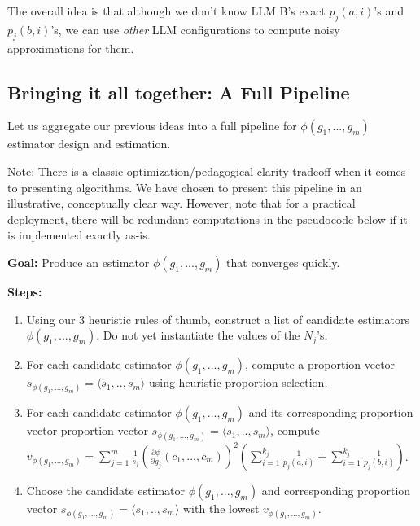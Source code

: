 \documentclass{article}
\begin{document}
The overall idea is that although we don't know LLM B's exact $\displaystyle p_{j}\left( a,i\right)$'s and $\displaystyle p_{j}\left( b,i\right)$'s, we can use \textit{other} LLM configurations to compute noisy approximations for them.



\subsection{Bringing it all together: A Full Pipeline}

Let us aggregate our previous ideas into a full pipeline for $\displaystyle \phi \left( g_{1} ,...,g_{m}\right)$ estimator design and estimation.



Note: There is a classic optimization/pedagogical clarity tradeoff when it comes to presenting algorithms. We have chosen to present this pipeline in an illustrative, conceptually clear way. However, note that for a practical deployment, there will be redundant computations in the pseudocode below if it is implemented exactly as-is.



\textbf{Goal:} Produce an estimator $\displaystyle \phi \left( g_{1} ,...,g_{m}\right)$ that converges quickly.



\textbf{Steps:}
\begin{enumerate}
\item Using our 3 heuristic rules of thumb, construct a list of candidate estimators $\displaystyle \phi \left( g_{1} ,...,g_{m}\right)$. Do not yet instantiate the values of the $\displaystyle N_{j}$'s.
\item For each candidate estimator $\displaystyle \phi \left( g_{1} ,...,g_{m}\right)$, compute a proportion vector $\displaystyle s_{\phi \left( g_{1} ,...,g_{m}\right)} =\langle s_{1} ,..,s_{m} \rangle $ using heuristic proportion selection.
\item For each candidate estimator $\displaystyle \phi \left( g_{1} ,...,g_{m}\right)$ and its corresponding proportion vector proportion vector $\displaystyle s_{\phi \left( g_{1} ,...,g_{m}\right)} =\langle s_{1} ,..,s_{m} \rangle $, compute $\displaystyle v_{\phi \left( g_{1} ,...,g_{m}\right)} =\sum _{j=1}^{m}\frac{1}{s_{j}}\left(\frac{\partial \phi }{\partial g_{j}}\left( c_{1} ,...,c_{m}\right)\right)^{2}\left(\sum _{i=1}^{k_{j}}\frac{1}{p_{j}\left( a,i\right)} +\sum _{i=1}^{k_{j}}\frac{1}{p_{j}\left( b,i\right)}\right)$.
\item Choose the candidate estimator $\displaystyle \phi \left( g_{1} ,...,g_{m}\right)$ and corresponding proportion vector $\displaystyle s_{\phi \left( g_{1} ,...,g_{m}\right)} =\langle s_{1} ,..,s_{m} \rangle $ with the lowest $\displaystyle v_{\phi \left( g_{1} ,...,g_{m}\right)}$.
\end{enumerate}
\end{document}
